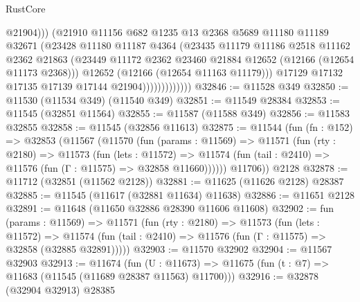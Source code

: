 \begin{lexlean}{RustCore}
\begin{coremodule}
                                @21904)))
                          (@21910
                            @11156
                            @682
                            @1235
                            @13
                            @2368
                            @5689
                            @11180
                            @11189
                            @32671
                            (@23428
                              @11180
                              @11187
                              @4364
                              (@23435
                                @11179
                                @11186
                                @2518
                                @11162
                                @2362
                                @21863
                                (@23449
                                  @11172
                                  @2362
                                  @23460
                                  @21884
                                  @12652
                                  (@12166 (@12654 @11173 @2368)))
                                @12652
                                (@12166 (@12654 @11163 @11179)))
                              @17129
                              @17132
                              @17135
                              @17139
                              @17144
                              @21904)))))))))))))
@32846 := @11528 @349
@32850 := @11530 (@11534 @349) (@11540 @349)
@32851 := @11549 @28384
@32853 := @11545 (@32851 @11564)
@32855 := @11587 (@11588 @349)
@32856 := @11583 @32855
@32858 := @11545 (@32856 @11613)
@32875 := @11544
    (fun (fn : @152) =>
    @32853
      (@11567
        (@11570
          (fun (params : @11569) =>
          @11571
            (fun (rty : @2180) =>
            @11573
              (fun (lets : @11572) =>
              @11574 (fun (tail : @2410) => @11576 (fun (Γ : @11575) => @32858 @11660))))))
        @11706))
    @2128
@32878 := @11712 (@32851 (@11562 @2128))
@32881 := @11625 (@11626 @2128) @28387
@32885 := @11545 (@11617 (@32881 @11634) @11638)
@32886 := @11651 @2128
@32891 := @11648 (@11650 @32886 @28390 @11606 @11608)
@32902 := fun (params : @11569) =>
  @11571
    (fun (rty : @2180) =>
    @11573
      (fun (lets : @11572) =>
      @11574 (fun (tail : @2410) => @11576 (fun (Γ : @11575) => @32858 (@32885 @32891)))))
@32903 := @11570 @32902
@32904 := @11567 @32903
@32913 := @11674
    (fun (U : @11673) => @11675 (fun (t : @7) => @11683 (@11545 (@11689 @28387 @11563) @11700)))
@32916 := @32878 (@32904 @32913) @28385

\end{coremodule}
\end{lexlean}
